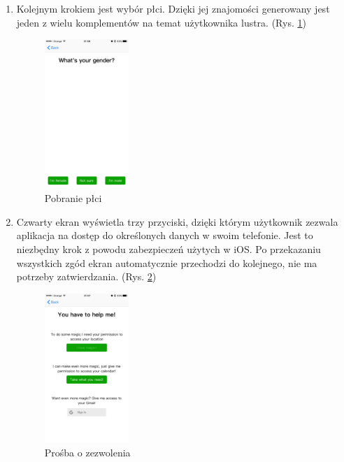 \documentclass[a4paper,11pt]{article}
\begin{document}
\begin{enumerate}
	\item Kolejnym krokiem jest wybór płci. Dzięki jej znajomości generowany jest jeden z wielu komplementów na temat użytkownika lustra. (Rys. \ref{setup3})
	\begin{figure}[H]
	\includegraphics[width=0.3\textwidth,center]{ios-screens/setup3.png}
	\caption {Pobranie płci}
	\label{setup3}
	\end{figure}

\item Czwarty ekran wyświetla trzy przyciski, dzięki którym użytkownik zezwala aplikacja na dostęp do określonych danych w swoim telefonie. Jest to niezbędny krok z powodu zabezpieczeń użytych w iOS. Po przekazaniu wszystkich zgód ekran automatycznie przechodzi do kolejnego, nie ma potrzeby zatwierdzania. (Rys. \ref{setup4})
\begin{figure}[H]
	\includegraphics[width=0.3\textwidth,center]{ios-screens/setup4.png}
	\caption {Prośba o zezwolenia}
	\label{setup4}
\end{figure}


\end{enumerate}
\end{document}
